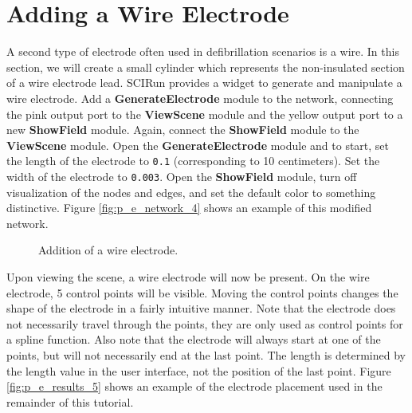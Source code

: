 \documentclass[fleqn,11pt,openany]{book}
\begin{document}
\section{Adding a Wire Electrode}

A second type of electrode often used in defibrillation scenarios is a
wire. In this section, we will create a small cylinder which
represents the non-insulated section of a wire electrode lead. SCIRun
provides a widget to generate and manipulate a wire electrode. Add a
{\bf GenerateElectrode} module to the network, connecting the
pink output port to the {\bf ViewScene} module and the yellow output
port to a new {\bf ShowField} module. Again, connect the {\bf
ShowField} module to the {\bf ViewScene} module. Open the {\bf
GenerateElectrode} module and to start, set the length of the
electrode to {\tt 0.1} (corresponding to 10 centimeters). Set the
width of the electrode to {\tt 0.003}. Open the {\bf ShowField}
module, turn off visualization of the nodes and edges, and set the
default color to something distinctive. Figure \ref{fig:p_e_network_4}
shows an example of this modified network.

\begin{figure}
\caption{Addition of a wire electrode.}\label{fig:p_e_network_5}
\end{figure}

Upon viewing the scene, a wire electrode will now be present. On the
wire electrode, 5 control points will be visible. Moving the control
points changes the shape of the electrode in a fairly intuitive
manner. Note that the electrode does not necessarily travel through
the points, they are only used as control points for a spline
function. Also note that the electrode will always start at one of the
points, but will not necessarily end at the last point. The length is
determined by the length value in the user interface, not the position
of the last point. Figure \ref{fig:p_e_results_5} shows an example of
the electrode placement used in the remainder of this tutorial.
\end{document}
